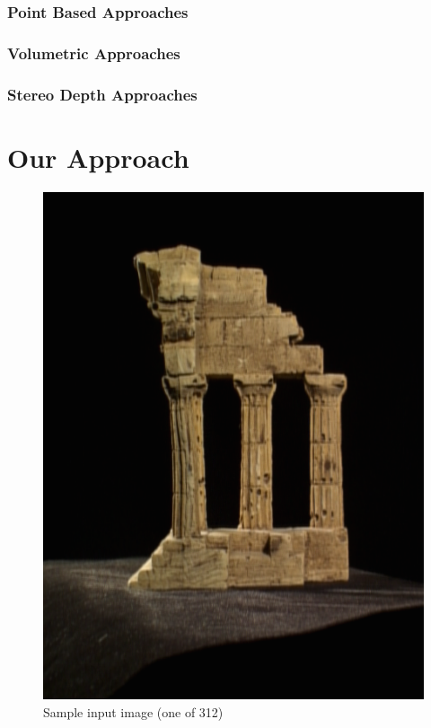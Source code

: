 \documentclass[10pt,twocolumn,letterpaper]{article}
\begin{document}
\subsubsection{Point Based Approaches}


\subsubsection{Volumetric Approaches}


\subsubsection{Stereo Depth Approaches}



\section{Our Approach}







\begin{figure}[t]
  \begin{center}
    \includegraphics[width=0.8\linewidth]{temple0001.png}
  \end{center}
  \caption{Sample input image (one of 312)}
  \label{fig:long}
  \label{fig:onecol}
\end{figure}
\end{document}

